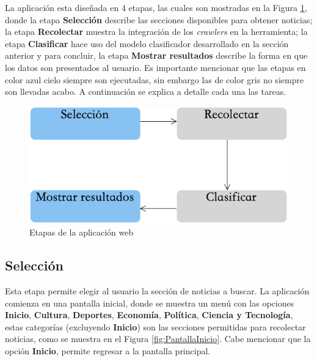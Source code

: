La aplicación esta diseñada en 4 etapas, las cuales son mostradas en la Figura \ref{fig:procesoAppWeb}, donde la etapa \textbf{Selección} describe las secciones disponibles para obtener noticias; la etapa \textbf{Recolectar} muestra la integración de los \textit{crawlers} en la herramienta; la etapa \textbf{Clasificar} hace uso del modelo clasificador desarrollado en la sección anterior y para concluir, la etapa \textbf{Mostrar resultados} describe la forma en que los datos son presentados al usuario. Es importante mencionar que las etapas en color azul cielo siempre son ejecutadas, sin embargo las de color gris no siempre son llevadas acabo. A continuación se explica a detalle cada una las tareas.


\begin{figure}[H]
	\centering
	\includegraphics[scale=0.6]{imagenes/ProcesoAplicacionWeb.png}
	\caption{Etapas de la aplicación web}
	\label{fig:procesoAppWeb}
\end{figure}


\subsection{Selección}


Esta etapa permite elegir al usuario la sección de noticias a buscar. La aplicación comienza en una pantalla inicial, donde se muestra un menú con las opciones \textbf{Inicio}, \textbf{Cultura}, \textbf{Deportes}, \textbf{Economía}, \textbf{Política}, \textbf{Ciencia y Tecnología}, estas categorías (excluyendo \textbf{Inicio}) son las secciones permitidas para recolectar noticias, como se muestra en el Figura \ref{fig:PantallaInicio}. Cabe mencionar que la opción \textbf{Inicio}, permite regresar a la pantalla principal.\\


